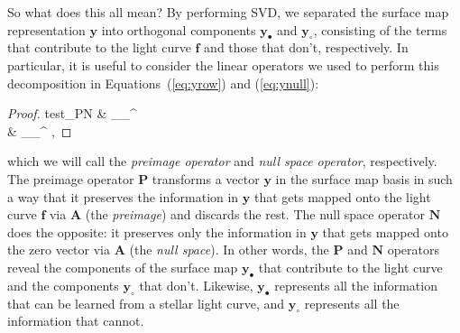 \documentclass[modern]{aastex62}
\begin{document}
So what does this all mean? By performing SVD, we separated
the surface map representation $\mathbf{y}$ into orthogonal components
$\mathbf{y}_\bullet$ and $\mathbf{y}_\circ$, consisting of the
terms that contribute to the light curve $\mathbf{f}$ and those
that don't, respectively. In particular, it is useful to consider
the linear operators we used to perform this decomposition
in Equations~(\ref{eq:yrow}) and (\ref{eq:ynull}):
%
\begin{proof}{test_PN}
     & \equiv {}_\bullet {}_\bullet^\top
    \\
     & \equiv {}_\circ {}_\circ^\top
    \quad,
\end{proof}
%
which we will call the \emph{preimage operator} and \emph{null space
    operator}, respectively. The preimage operator $\mathbf{P}$
transforms a vector $\mathbf{y}$ in the surface map basis in such a way
that it preserves the information in $\mathbf{y}$ that gets mapped
onto the light curve $\mathbf{f}$ via $\mathbf{A}$ (the \emph{preimage}) and discards the rest. The
null space operator $\mathbf{N}$ does the opposite: it preserves only
the information in $\mathbf{y}$ that gets mapped onto the zero
vector via $\mathbf{A}$ (the \emph{null space}).
%
In other words,
the $\mathbf{P}$ and $\mathbf{N}$ operators reveal the
components of the surface map $\mathbf{y}_\bullet$ that contribute to the
light curve and the components $\mathbf{y}_\circ$ that don't.
Likewise, $\mathbf{y}_\bullet$ represents all the information that can be
learned from a stellar light curve, and $\mathbf{y}_\circ$ represents all the
information that cannot.
\end{document}
